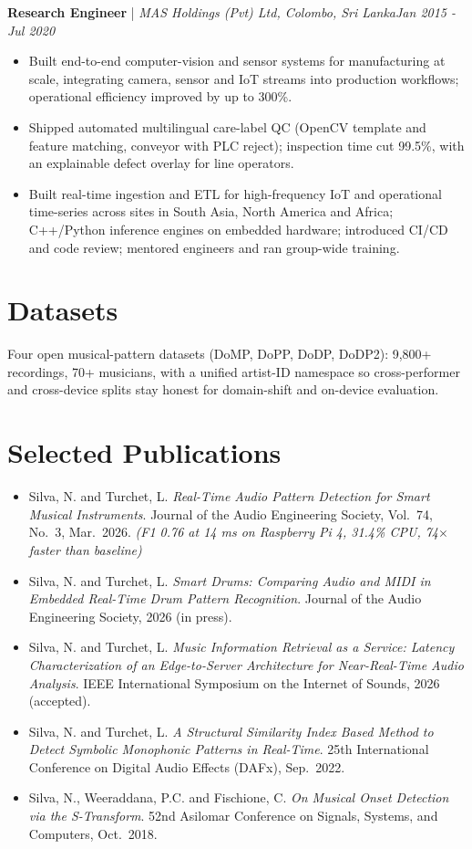 \documentclass[11pt]{article}
\newenvironment{cvrole}[5]{%
  \par\noindent\textbf{\large #1} | \textit{\small #2, #3}\hfill \textit{\small #4 - #5}\par
  \begin{itemize}[leftmargin=2em, itemsep=-0.3em, topsep=-0.5em]%
}{%
  \end{itemize}\par\noindent\mbox{}\par\vspace{0.1em}%
}
\begin{document}
\begin{cvrole}{Research Engineer}{MAS Holdings (Pvt) Ltd}{Colombo, Sri Lanka}{Jan 2015}{Jul 2020}
    \item Built end-to-end computer-vision and sensor systems for manufacturing at scale, integrating camera, sensor and IoT streams into production workflows; operational efficiency improved by up to 300\%.
    \item Shipped automated multilingual care-label QC (OpenCV template and feature matching, conveyor with PLC reject); inspection time cut 99.5\%, with an explainable defect overlay for line operators.
    \item Built real-time ingestion and ETL for high-frequency IoT and operational time-series across sites in South Asia, North America and Africa; C++/Python inference engines on embedded hardware; introduced CI/CD and code review; mentored engineers and ran group-wide training.
\end{cvrole}

\section*{Datasets \footnotesize {}}
Four open musical-pattern datasets (DoMP, DoPP, DoDP, DoDP2): 9,800+ recordings, 70+ musicians, with a unified artist-ID namespace so cross-performer and cross-device splits stay honest for domain-shift and on-device evaluation.

\section*{Selected Publications \footnotesize {}}
\begin{itemize}[leftmargin=1.2em, itemsep=-0.25em]
    \item Silva, N. and Turchet, L. \textit{Real-Time Audio Pattern Detection for Smart Musical Instruments}. Journal of the Audio Engineering Society, Vol.~74, No.~3, Mar.~2026. \textit{(F1 0.76 at 14 ms on Raspberry Pi 4, 31.4\% CPU, 74$\times$ faster than baseline)}
    \item Silva, N. and Turchet, L. \textit{Smart Drums: Comparing Audio and MIDI in Embedded Real-Time Drum Pattern Recognition}. Journal of the Audio Engineering Society, 2026 (in press).
    \item Silva, N. and Turchet, L. \textit{Music Information Retrieval as a Service: Latency Characterization of an Edge-to-Server Architecture for Near-Real-Time Audio Analysis}. IEEE International Symposium on the Internet of Sounds, 2026 (accepted).
    \item Silva, N. and Turchet, L. \textit{A Structural Similarity Index Based Method to Detect Symbolic Monophonic Patterns in Real-Time}. 25th International Conference on Digital Audio Effects (DAFx), Sep.~2022.
    \item Silva, N., Weeraddana, P.C. and Fischione, C. \textit{On Musical Onset Detection via the S-Transform}. 52nd Asilomar Conference on Signals, Systems, and Computers, Oct.~2018.
\end{itemize}
\end{document}
